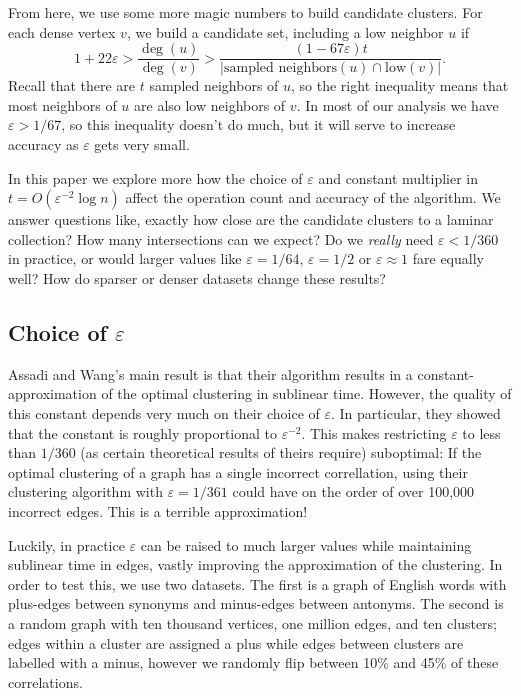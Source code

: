 \documentclass[
]{article}
\begin{document}
From here, we use some more magic numbers to build candidate clusters.
For each dense vertex {\(v\)}, we build a candidate set, including a low
neighbor {\(u\)} if
  {\[1 + 22\varepsilon > \frac{\deg(u)}{\deg(v)} > \frac{(1 - 67\varepsilon)t}{|\text{sampled\ neighbors}(u) \cap \text{low}(v)|}.\]}Recall
that there are {\(t\)} sampled neighbors of {\(u\)}, so the right
inequality means that most neighbors of {\(u\)} are also low neighbors
of {\(v\)}. In most of our analysis we have {\(\varepsilon > 1/67\)}, so
this inequality doesn't do much, but it will serve to
increase accuracy as {\(\varepsilon\)} gets very small.

In this paper we explore more how the choice of {\(\varepsilon\)} and
constant multiplier in {\(t = O(\varepsilon^{- 2}\log n)\)} affect the
operation count and accuracy of the algorithm. We answer questions like,
exactly how close are the candidate clusters to a laminar collection?
How many intersections can we expect? Do we \emph{really} need
  {\(\varepsilon < 1/360\)} in practice, or would larger values like
  {\(\varepsilon = 1/64\)}, {\(\varepsilon = 1/2\)} or
  {\(\varepsilon \approx 1\)} fare equally well? How do sparser or denser
datasets change these results?

\hypertarget{choice-of-varepsilon}{%
  \subsection{\texorpdfstring{Choice of
        {\(\varepsilon\)}}{Choice of \textbackslash varepsilon}}\label{choice-of-varepsilon}}

Assadi and Wang's main result is that their algorithm
results in a constant-approximation of the optimal clustering in
sublinear time. However, the quality of this constant depends very much
on their choice of {\(\varepsilon\)}. In particular, they showed that
the constant is roughly proportional to {\(\varepsilon^{- 2}\)}. This
makes restricting {\(\varepsilon\)} to less than {\(1/360\)} (as certain
theoretical results of theirs require) suboptimal: If the optimal
clustering of a graph has a single incorrect correllation, using their
clustering algorithm with {\(\varepsilon = 1/361\)} could have on the
order of over 100,000 incorrect edges. This is a terrible approximation!

Luckily, in practice {\(\varepsilon\)} can be raised to much larger
values while maintaining sublinear time in edges, vastly improving the
approximation of the clustering. In order to test this, we use two
datasets. The first is a graph of English words with plus-edges between
synonyms and minus-edges between antonyms. The second is a random graph
with ten thousand vertices, one million edges, and ten clusters; edges
within a cluster are assigned a plus while edges between clusters are
labelled with a minus, however we randomly flip between 10\% and 45\% of
these correlations.
\end{document}
